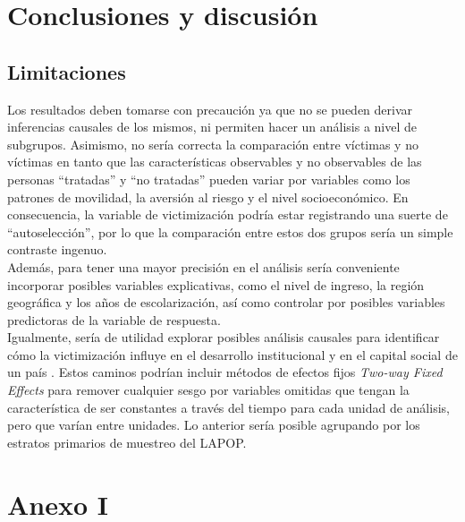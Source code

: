 \documentclass[letterpaper]{article}
\begin{document}
\vspace{-1.5cm}

\section{Conclusiones y discusión}

\subsection{Limitaciones}

Los resultados deben tomarse con precaución ya que no se pueden derivar inferencias causales de los mismos, ni permiten hacer un análisis a nivel de subgrupos. Asimismo, no sería correcta la comparación entre víctimas y no víctimas en tanto que las características observables y no observables de las personas “tratadas” y “no tratadas” pueden variar por variables como los patrones de movilidad, la aversión al riesgo y el nivel socioeconómico. En consecuencia, la variable de victimización podría estar registrando una suerte de “autoselección”, por lo que la comparación entre estos dos grupos sería un simple contraste ingenuo. \\[-1.5em]

Además, para tener una mayor precisión en el análisis sería conveniente incorporar posibles variables explicativas, como el nivel de ingreso, la región geográfica y los años de escolarización, así como controlar por posibles variables predictoras de la variable de respuesta.\\[-1.5em]

Igualmente, sería de utilidad explorar posibles análisis causales para identificar cómo la victimización influye en el desarrollo institucional y en el capital social de un país \autocite{corbacho2015, corbacho2012, cozzubo2021, putnam1994, blanco2012, blanco2013b}. Estos caminos podrían incluir métodos de efectos fijos \emph{Two-way Fixed Effects} para remover cualquier sesgo por variables omitidas que tengan la característica de ser constantes a través del tiempo para cada unidad de análisis, pero que varían entre unidades. Lo anterior sería posible agrupando por los estratos primarios de muestreo del LAPOP.

\vspace{-0.4cm}

\section{Anexo I}
\end{document}
